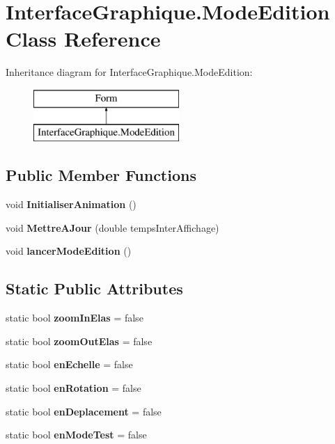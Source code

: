 \hypertarget{class_interface_graphique_1_1_mode_edition}{}\section{Interface\+Graphique.\+Mode\+Edition Class Reference}
\label{class_interface_graphique_1_1_mode_edition}
Inheritance diagram for Interface\+Graphique.\+Mode\+Edition\+:\begin{figure}[H]
\begin{center}
\leavevmode
\includegraphics[height=2.000000cm]{class_interface_graphique_1_1_mode_edition}
\end{center}
\end{figure}
\subsection*{Public Member Functions}
\begin{DoxyCompactItemize}
\item 
void {\bfseries Initialiser\+Animation} ()
\item 
void {\bfseries Mettre\+A\+Jour} (double temps\+Inter\+Affichage)
\item 
void {\bfseries lancer\+Mode\+Edition} ()
\end{DoxyCompactItemize}
\subsection*{Static Public Attributes}
\begin{DoxyCompactItemize}
\item 
static bool {\bfseries zoom\+In\+Elas} = false
\item 
static bool {\bfseries zoom\+Out\+Elas} = false
\item 
static bool {\bfseries en\+Echelle} = false
\item 
static bool {\bfseries en\+Rotation} = false
\item 
static bool {\bfseries en\+Deplacement} = false
\item 
static bool {\bfseries en\+Mode\+Test} = false
\end{DoxyCompactItemize}
